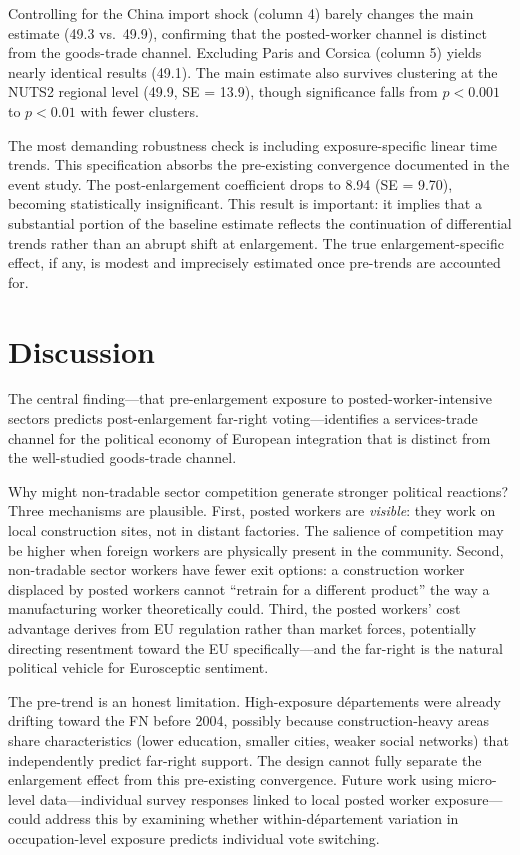 \documentclass[12pt]{article}
\begin{document}
Controlling for the China import shock (column 4) barely changes the main estimate (49.3 vs.\ 49.9), confirming that the posted-worker channel is distinct from the goods-trade channel. Excluding Paris and Corsica (column 5) yields nearly identical results (49.1). The main estimate also survives clustering at the NUTS2 regional level (49.9, SE = 13.9), though significance falls from $p < 0.001$ to $p < 0.01$ with fewer clusters.

The most demanding robustness check is including exposure-specific linear time trends. This specification absorbs the pre-existing convergence documented in the event study. The post-enlargement coefficient drops to 8.94 (SE = 9.70), becoming statistically insignificant. This result is important: it implies that a substantial portion of the baseline estimate reflects the continuation of differential trends rather than an abrupt shift at enlargement. The true enlargement-specific effect, if any, is modest and imprecisely estimated once pre-trends are accounted for.



\section{Discussion}

The central finding---that pre-enlargement exposure to posted-worker-intensive sectors predicts post-enlargement far-right voting---identifies a services-trade channel for the political economy of European integration that is distinct from the well-studied goods-trade channel.

Why might non-tradable sector competition generate stronger political reactions? Three mechanisms are plausible. First, posted workers are \emph{visible}: they work on local construction sites, not in distant factories. The salience of competition may be higher when foreign workers are physically present in the community. Second, non-tradable sector workers have fewer exit options: a construction worker displaced by posted workers cannot ``retrain for a different product'' the way a manufacturing worker theoretically could. Third, the posted workers' cost advantage derives from EU regulation rather than market forces, potentially directing resentment toward the EU specifically---and the far-right is the natural political vehicle for Eurosceptic sentiment.

The pre-trend is an honest limitation. High-exposure d\'epartements were already drifting toward the FN before 2004, possibly because construction-heavy areas share characteristics (lower education, smaller cities, weaker social networks) that independently predict far-right support. The design cannot fully separate the enlargement effect from this pre-existing convergence. Future work using micro-level data---individual survey responses linked to local posted worker exposure---could address this by examining whether within-d\'epartement variation in occupation-level exposure predicts individual vote switching.
\end{document}

